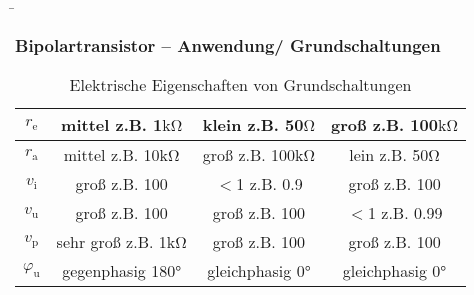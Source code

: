 \begin{frame}
    \b{ \frametitle{Bipolartransistor -- Anwendung/ Grundschaltungen}
        \begin{table}[H]
            \centering
            \begin{tabular}{|c|c|c|c|}
                \hline
                $r_\mathrm{e}$ & mittel z.B. 1$\mathrm{k \Omega}$ & klein z.B. 50$\mathrm{\Omega}$ & groß z.B. 100$\mathrm{k \Omega}$ \\
                \hline
                $r_\mathrm{a}$ & mittel z.B. 10$\mathrm{k \Omega}$ & groß z.B. 100$\mathrm{k \Omega}$ & lein z.B. 50$\mathrm{\Omega}$ \\
                \hline
                $v_\mathrm{i}$ & groß z.B. 100 & $<$1 z.B. 0.9 &  groß z.B. 100 \\
                \hline
                $v_\mathrm{u}$ & groß z.B. 100 &  groß z.B. 100 & $<$1 z.B. 0.99 \\
                \hline
                $v_\mathrm{p}$ & sehr groß z.B. 1$\mathrm{k \Omega}$ &  groß z.B. 100 & groß z.B. 100 \\
                \hline
                $\varphi_\mathrm{u}$ & gegenphasig 180° & gleichphasig 0° & gleichphasig 0° \\
                \hline
            \end{tabular}
            \caption{Elektrische Eigenschaften von Grundschaltungen}
        \end{table}
    }
\end{frame}


